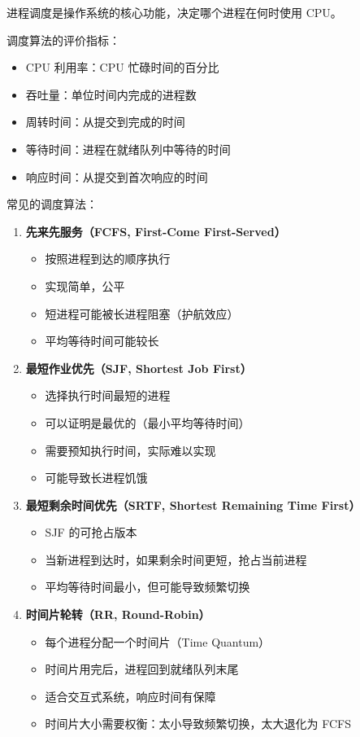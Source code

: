 进程调度是操作系统的核心功能，决定哪个进程在何时使用 CPU。


调度算法的评价指标：
\begin{itemize}
  \item CPU 利用率：CPU 忙碌时间的百分比
  \item 吞吐量：单位时间内完成的进程数
  \item 周转时间：从提交到完成的时间
  \item 等待时间：进程在就绪队列中等待的时间
  \item 响应时间：从提交到首次响应的时间
\end{itemize}

常见的调度算法：

\begin{enumerate}
  \item \textbf{先来先服务（FCFS, First-Come First-Served）}
    \begin{itemize}
      \item 按照进程到达的顺序执行
      \item 实现简单，公平
      \item 短进程可能被长进程阻塞（护航效应）
      \item 平均等待时间可能较长
    \end{itemize}

  \item \textbf{最短作业优先（SJF, Shortest Job First）}
    \begin{itemize}
      \item 选择执行时间最短的进程
      \item 可以证明是最优的（最小平均等待时间）
      \item 需要预知执行时间，实际难以实现
      \item 可能导致长进程饥饿
    \end{itemize}

  \item \textbf{最短剩余时间优先（SRTF, Shortest Remaining Time First）}
    \begin{itemize}
      \item SJF 的可抢占版本
      \item 当新进程到达时，如果剩余时间更短，抢占当前进程
      \item 平均等待时间最小，但可能导致频繁切换
    \end{itemize}

  \item \textbf{时间片轮转（RR, Round-Robin）}
    \begin{itemize}
      \item 每个进程分配一个时间片（Time Quantum）
      \item 时间片用完后，进程回到就绪队列末尾
      \item 适合交互式系统，响应时间有保障
      \item 时间片大小需要权衡：太小导致频繁切换，太大退化为 FCFS
    \end{itemize}


\end{enumerate}
